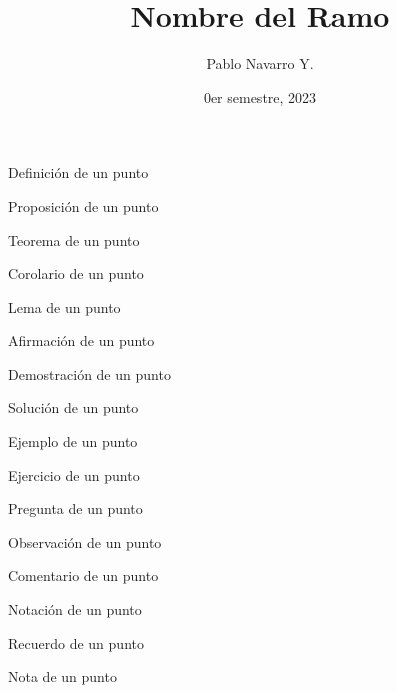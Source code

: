 \documentclass{apuntes}
\title{Nombre del Ramo}
\author{Pablo Navarro Y.}
\date{0er semestre, 2023}
\begin{document}
\renewcommand{\onlyinsubfile}[1]{}
\renewcommand{\notinsubfile}[1]{#1}

\maketitle


\begin{definicion}
  Definición de un punto
\end{definicion}

\begin{prop}
  Proposición de un punto
\end{prop}

\begin{teorema}
  Teorema de un punto
\end{teorema}

\begin{corolario}
  Corolario de un punto
\end{corolario}

\begin{lema}
  Lema de un punto
\end{lema}

\begin{aff}
  Afirmación de un punto
\end{aff}

\begin{dem}
  Demostración de un punto
\end{dem}

\begin{sol}
  Solución de un punto
\end{sol}

\begin{ejemplo}
  Ejemplo de un punto
\end{ejemplo}

\begin{ejercicio}
  Ejercicio de un punto
\end{ejercicio}

\begin{pregunta}
  Pregunta de un punto
\end{pregunta}

\begin{obs}
  Observación de un punto
\end{obs}

\begin{comentario}
  Comentario de un punto
\end{comentario}

\begin{notacion}
  Notación de un punto
\end{notacion}

\begin{recuerdo}
  Recuerdo de un punto
\end{recuerdo}

\begin{nota}
  Nota de un punto
\end{nota}
\end{document}
